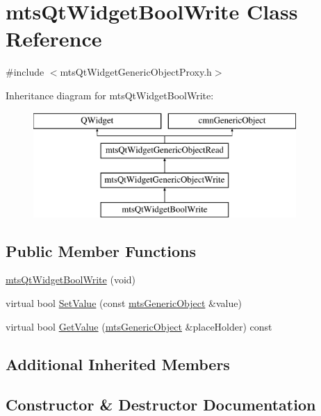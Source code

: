 \hypertarget{classmts_qt_widget_bool_write}{}\section{mts\+Qt\+Widget\+Bool\+Write Class Reference}
\label{classmts_qt_widget_bool_write}


{\ttfamily \#include $<$mts\+Qt\+Widget\+Generic\+Object\+Proxy.\+h$>$}

Inheritance diagram for mts\+Qt\+Widget\+Bool\+Write\+:\begin{figure}[H]
\begin{center}
\leavevmode
\includegraphics[height=4.000000cm]{d5/db4/classmts_qt_widget_bool_write}
\end{center}
\end{figure}
\subsection*{Public Member Functions}
\begin{DoxyCompactItemize}
\item 
\hyperlink{classmts_qt_widget_bool_write_a6dbd06a1702301e994020594b385f699}{mts\+Qt\+Widget\+Bool\+Write} (void)
\item 
virtual bool \hyperlink{classmts_qt_widget_bool_write_a5eb2213b3487392f77624abcd92872fc}{Set\+Value} (const \hyperlink{classmts_generic_object}{mts\+Generic\+Object} \&value)
\item 
virtual bool \hyperlink{classmts_qt_widget_bool_write_aabe9cf39d7962d5c2d96d9fb3a250bb2}{Get\+Value} (\hyperlink{classmts_generic_object}{mts\+Generic\+Object} \&place\+Holder) const 
\end{DoxyCompactItemize}
\subsection*{Additional Inherited Members}


\subsection{Constructor \& Destructor Documentation}
\hypertarget{classmts_qt_widget_bool_write_a6dbd06a1702301e994020594b385f699}{}
